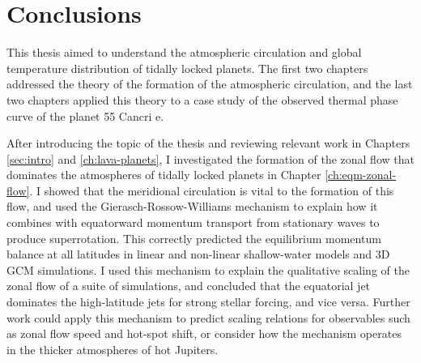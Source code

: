 \chapter{Conclusions}\label{ch:conclusions}


This thesis aimed to understand the atmospheric circulation and global temperature distribution of tidally locked planets. The first two chapters addressed the theory of the formation of the atmospheric circulation, and the last two chapters applied this theory to a case study of the observed thermal phase curve of the planet 55 Cancri e.


After introducing the topic of the thesis and reviewing relevant work in Chapters \ref{sec:intro} and \ref{ch:lava-planets}, I investigated the formation of the zonal flow that dominates the atmospheres of tidally locked planets in Chapter \ref{ch:eqm-zonal-flow}. I showed that the meridional circulation is vital to the formation of this flow, and used the Gierasch-Rossow-Williams mechanism to explain how it combines with equatorward momentum transport from stationary waves to produce superrotation. This correctly predicted the equilibrium momentum balance at all latitudes in linear and non-linear shallow-water models and 3D GCM simulations. I used this mechanism to explain the qualitative scaling of the zonal flow of a suite of simulations, and concluded that the equatorial jet dominates the high-latitude jets for strong stellar forcing, and vice versa. Further work could apply this mechanism to predict scaling relations for observables such as zonal flow speed and hot-spot shift, or consider how the mechanism operates in the thicker atmospheres of hot Jupiters.


